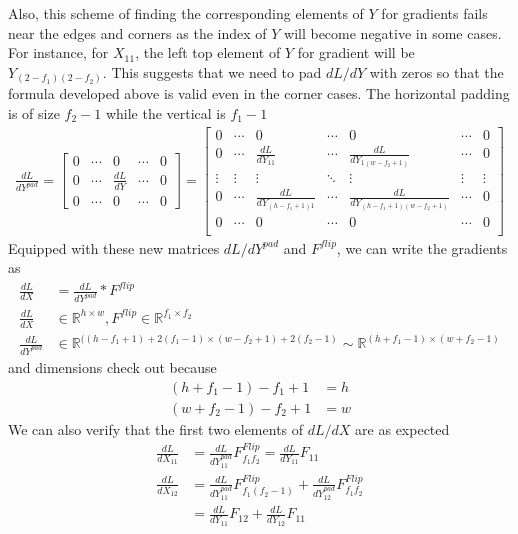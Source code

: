 \documentclass[../../deep_learning_notes.tex]{subfiles}
\begin{document}
Also, this scheme of finding the corresponding elements of $Y$ for gradients fails near the edges and corners as the index of $Y$ will become negative in some cases. For instance, for $X_{11}$, the left top element of $Y$ for gradient will be $Y_{(2-f_{1})(2-f_{2})}$. This suggests that we need to pad $dL/dY$ with zeros so that the formula developed above is valid even in the corner cases. The horizontal padding is of size $f_{2}-1$ while the vertical is $f_{1}-1$
\begin{align*}
    \frac{dL}{dY^{pad}} =
    \begin{bmatrix}
        0 &\cdots &0 &\cdots &0\\
        0 &\cdots &\frac{dL}{dY} &\cdots &0\\
        0 &\cdots &0 &\cdots &0
    \end{bmatrix} =
     \begin{bmatrix}
        0 &\cdots &0 &\cdots &0 &\cdots &0\\
        0 &\cdots &\frac{dL}{dY_{11}} &\cdots &\frac{dL}{dY_{1(w-f_{2}+1)}} &\cdots &0\\
        \vdots &\vdots &\vdots &\ddots &\vdots &\vdots &\vdots\\
        0 &\cdots &\frac{dL}{dY_{(h-f_{1}+1)1}} &\cdots &\frac{dL}{dY_{(h-f_{1}+1)(w-f_{2}+1)}} &\cdots &0\\
        0 & \cdots &0 &\cdots &0 &\cdots &0\\
    \end{bmatrix}
\end{align*}
Equipped with these new matrices $dL/dY^{pad}$ and $F^{flip}$, we can write the gradients as
\begin{align*}
    \frac{dL}{dX} &= \frac{dL}{dY^{pad}} * F^{flip}\\
    \frac{dL}{dX} &\in \mathbb{R}^{h \times w}, F^{flip} \in \mathbb{R}^{f_{1} \times f_{2}}\\
    \frac{dL}{dY^{pad}} &\in \mathbb{R}^{((h-f_{1}+1)+2(f_{1}-1) \times (w-f_{2}+1) + 2(f_{2}-1)} \sim \mathbb{R}^{(h+f_{1}-1) \times (w+f_{2}-1)}
\end{align*}
and dimensions check out because
\begin{align*}
    (h+f_{1}-1) - f_{1} + 1 &= h\\
    (w+f_{2}-1) - f_{2} + 1 &= w
\end{align*}
We can also verify that the first two elements of $dL/dX$ are as expected
\begin{align*}
    \frac{dL}{dX_{11}} &= \frac{dL}{dY^{pad}_{11}} F^{Flip}_{f_{1}f_{2}} = \frac{dL}{dY_{11}} F_{11}\\
    \frac{dL}{dX_{12}} &= \frac{dL}{dY^{pad}_{11}} F^{Flip}_{f_{1}(f_{2}-1)} + \frac{dL}{dY^{pad}_{12}} F^{Flip}_{f_{1}f_{2}}\\ &= \frac{dL}{dY_{11}} F_{12} + \frac{dL}{dY_{12}} F_{11}\\
\end{align*}
\end{document}
